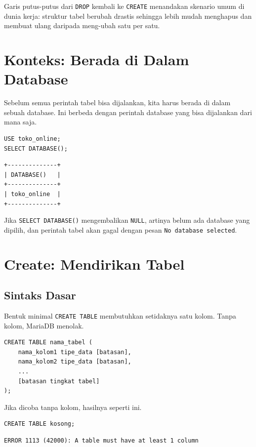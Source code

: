 \documentclass[11pt,a4paper]{article}
\begin{document}
Garis putus-putus dari \texttt{DROP} kembali ke \texttt{CREATE} menandakan skenario umum di dunia kerja: struktur tabel berubah drastis sehingga lebih mudah menghapus dan membuat ulang daripada meng-ubah satu per satu.

\section{Konteks: Berada di Dalam Database}

Sebelum semua perintah tabel bisa dijalankan, kita harus berada di dalam sebuah database. Ini berbeda dengan perintah database yang bisa dijalankan dari mana saja.

\begin{lstlisting}[style=code]
USE toko_online;
SELECT DATABASE();
\end{lstlisting}

\begin{lstlisting}[style=out]
+--------------+
| DATABASE()   |
+--------------+
| toko_online  |
+--------------+
\end{lstlisting}

Jika \texttt{SELECT DATABASE()} mengembalikan \texttt{NULL}, artinya belum ada database yang dipilih, dan perintah tabel akan gagal dengan pesan \texttt{No database selected}.

\section{Create: Mendirikan Tabel}

\subsection{Sintaks Dasar}

Bentuk minimal \texttt{CREATE TABLE} membutuhkan setidaknya satu kolom. Tanpa kolom, MariaDB menolak.

\begin{lstlisting}[style=code]
CREATE TABLE nama_tabel (
    nama_kolom1 tipe_data [batasan],
    nama_kolom2 tipe_data [batasan],
    ...
    [batasan tingkat tabel]
);
\end{lstlisting}

Jika dicoba tanpa kolom, hasilnya seperti ini.

\begin{lstlisting}[style=code]
CREATE TABLE kosong;
\end{lstlisting}

\begin{lstlisting}[style=out]
ERROR 1113 (42000): A table must have at least 1 column
\end{lstlisting}
\end{document}
